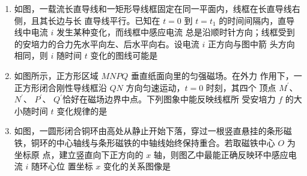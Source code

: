 \begin{enumerate}
\pfourchoices
{}
{}
{}
{}






\item
{}
如图，一载流长直导线和一矩形导线框固定在同一平面内，线框在长直导线右侧，且其长边与长
直导线平行。已知在 $ t=0 $ 到 $ t= t_{1} $ 的时间间隔内，直导线中电流 $ i $ 发生某种变化，而线框中感应电流
总是沿顺时针方向；线框受到的安培力的合力先水平向左、后水平向右。设电流 $ i $ 正方向与图中箭
头方向相同，则 $ i $ 随时间 $ t $ 变化的图线可能是  
\begin{figure}[h!]
\centering

\end{figure}


\pfourchoices
{}
{}
{}
{}


\item 
{}
如图所示，正方形区域 $ MNPQ $ 垂直纸面向里的匀强磁场。在外力
作用下，一正方形闭合刚性导线框沿 $ QN $ 方向匀速运动，$ t=0 $ 时刻，其四个
顶点 $ M^{\prime} $、 $ N^{\prime} $、 $ P^{\prime} $、 $ Q^{\prime} $恰好在磁场边界中点。下列图象中能反映线框所
受安培力 $ f $ 的大小随时间 $ t $ 变化规律的是  
\begin{figure}[h!]
\centering

\end{figure}


\pfourchoices
{}
{}
{}
{}


\item 
{}
如图，一圆形闭合铜环由高处从静止开始下落，穿过一根竖直悬挂的条形磁
铁，铜环的中心轴线与条形磁铁的中轴线始终保持重合。若取磁铁中心 $ O $ 为坐标原
点，建立竖直向下正方向的 $ x $ 轴，则图乙中最能正确反映环中感应电流 $ i $ 随环心位
置坐标 $ x $ 变化的关系图像是  
\begin{figure}[h!]
\centering

\end{figure}


\end{enumerate}
